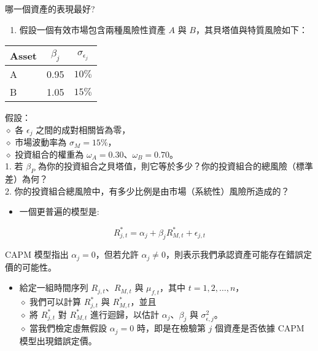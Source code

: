 \documentclass[letterpaper]{article}
\begin{document}
哪一個資產的表現最好?

\begin{enumerate}
	\item 假設一個有效市場包含兩種風險性資產 $A$ 與 $B$，其貝塔值與特質風險如下：
\end{enumerate}


\begin{center}
\begin{tabular}{lcc}
\hline
Asset & $\beta_{j}$ & $\sigma_{\epsilon_{j}}$ \\
\hline
A & 0.95 & $10 \%$ \\
B & 1.05 & $15 \%$ \\
\hline
\end{tabular}
\end{center}

假設：\\
$\diamond$ 各 $\epsilon_{j}$ 之間的成對相關皆為零，\\
$\diamond$ 市場波動率為 $\sigma_{M}=15\%$，\\
$\diamond$ 投資組合的權重為 $\omega_{A}=0.30$、$\omega_{B}=0.70$。\\

1. 若 $\beta_{P}$ 為你的投資組合之貝塔值，則它等於多少？你的投資組合的總風險（標準差）為何？\\
2. 你的投資組合總風險中，有多少比例是由市場（系統性）風險所造成的？


\begin{itemize}
  \item 一個更普遍的模型是:
\end{itemize}

$$
R_{j, t}^{*}=\alpha_{j}+\beta_{j} R_{M, t}^{*}+\epsilon_{j, t}
$$

CAPM 模型指出 $\alpha_{j}=0$，但若允許 $\alpha_{j} \neq 0$，則表示我們承認資產可能存在錯誤定價的可能性。

\begin{itemize}
	\item 給定一組時間序列 $R_{j, t}$、$R_{M, t}$ 與 $\mu_{f, t}$，其中 $t=1,2,\ldots,n$，\\
	$\diamond$ 我們可以計算 $R_{j, t}^{*}$ 與 $R_{M, t}^{*}$，並且\\
	$\diamond$ 將 $R_{j, t}^{*}$ 對 $R_{M, t}^{*}$ 進行迴歸，以估計 $\alpha_{j}$、$\beta_{j}$ 與 $\sigma_{\epsilon, j}^{2}$。\\
	$\diamond$ 當我們檢定虛無假設 $\alpha_{j}=0$ 時，即是在檢驗第 $j$ 個資產是否依據 CAPM 模型出現錯誤定價。
\end{itemize}
\end{document}
